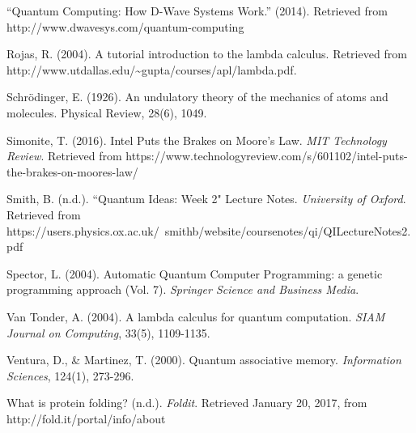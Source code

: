 \documentclass[11pt]{report}
\newcommand{\?}{\stackrel{?}{=}}
\begin{document}
\begin{thebibliography}{9}
  “Quantum Computing: How D-Wave Systems Work.” (2014). Retrieved from http://www.dwavesys.com/quantum-computing
  
  Rojas, R. (2004). A tutorial introduction to the lambda calculus. Retrieved from http://www.utdallas.edu/\textasciitilde gupta/courses/apl/lambda.pdf.  
  
  Schrödinger, E. (1926). An undulatory theory of the mechanics of atoms and molecules. Physical Review, 28(6), 1049.

  Simonite, T. (2016). Intel Puts the Brakes on Moore's Law. \emph{MIT Technology Review}. Retrieved from https://www.technologyreview.com/s/601102/intel-puts-the-brakes-on-moores-law/

   Smith, B. (n.d.). ``Quantum Ideas: Week 2" Lecture Notes. \emph{University of Oxford}. Retrieved from https://users.physics.ox.ac.uk/~smithb/website/coursenotes/qi/QILectureNotes2.pdf

  Spector, L. (2004). Automatic Quantum Computer Programming: a genetic programming approach (Vol. 7). \emph{Springer Science and Business Media}.

  Van Tonder, A. (2004). A lambda calculus for quantum computation. \emph{SIAM Journal on Computing}, 33(5), 1109-1135.

  Ventura, D., \& Martinez, T. (2000). Quantum associative memory. \emph{Information Sciences}, 124(1), 273-296.

  What is protein folding? (n.d.). \emph{Foldit}. Retrieved January 20, 2017, from http://fold.it/portal/info/about

\end{thebibliography}
\end{document}
